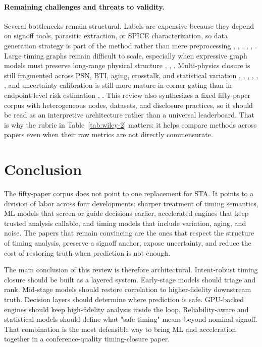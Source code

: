 \documentclass[num-refs]{wiley-article}
\begin{document}
    \paragraph{Remaining challenges and threats to validity.} Several bottlenecks remain structural. Labels are expensive because they depend on signoff tools, parasitic extraction, or SPICE characterization, so data generation strategy is part of the method rather than mere preprocessing \cite{ref4}, \cite{ref6}, \cite{ref8}, \cite{ref10}, \cite{ref13}, \cite{ref25}. Large timing graphs remain difficult to scale, especially when expressive graph models must preserve long-range physical structure \cite{ref5}, \cite{ref17}, \cite{ref43}. Multi-physics closure is still fragmented across PSN, BTI, aging, crosstalk, and statistical variation \cite{ref12}, \cite{ref14}, \cite{ref15}, \cite{ref44}, \cite{ref48}, \cite{ref49}, and uncertainty calibration is still more mature in corner gating than in endpoint-level risk estimation \cite{ref16}, \cite{ref9}. This review also synthesizes a fixed fifty-paper corpus with heterogeneous nodes, datasets, and disclosure practices, so it should be read as an interpretive architecture rather than a universal leaderboard. That is why the rubric in Table~\ref{tab:wiley-2} matters: it helps compare methods across papers even when their raw metrics are not directly commensurate.


    \section{Conclusion}

    The fifty-paper corpus does not point to one replacement for STA. It points to a division of labor across four developments: sharper treatment of timing semantics, ML models that screen or guide decisions earlier, accelerated engines that keep trusted analysis callable, and timing models that include variation, aging, and noise. The papers that remain convincing are the ones that respect the structure of timing analysis, preserve a signoff anchor, expose uncertainty, and reduce the cost of restoring truth when prediction is not enough.


    The main conclusion of this review is therefore architectural. Intent-robust timing closure should be built as a layered system. Early-stage models should triage and rank. Mid-stage models should restore correlation to higher-fidelity downstream truth. Decision layers should determine where prediction is safe. GPU-backed engines should keep high-fidelity analysis inside the loop. Reliability-aware and statistical models should define what "safe timing" means beyond nominal signoff. That combination is the most defensible way to bring ML and acceleration together in a conference-quality timing-closure paper.
\end{document}
